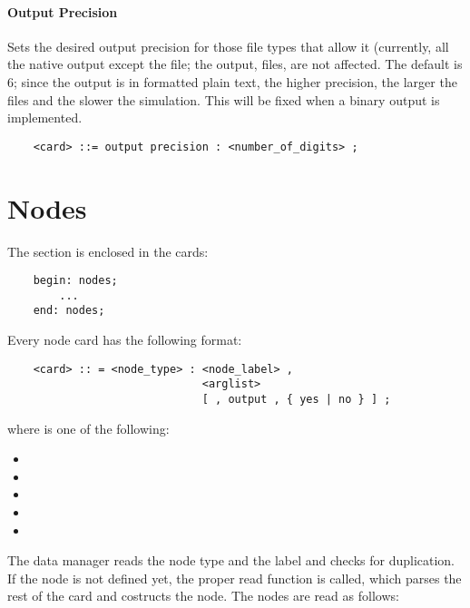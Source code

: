\subsubsection{Output Precision}
Sets the desired output precision for those file types that allow it
(currently, all the native output except the  file; the
 output,  files, are not affected.
The default is 6; since the output is in formatted plain text, the higher
precision, the larger the files and the slower the simulation.
This will be fixed when a binary output is implemented.
\begin{verbatim}
    <card> ::= output precision : <number_of_digits> ;
\end{verbatim}





\chapter{Nodes}
The  section is enclosed in the cards:
\begin{verbatim}
    begin: nodes;
        ...
    end: nodes;
\end{verbatim}
Every node card has the following format:
\begin{verbatim}
    <card> :: = <node_type> : <node_label> ,
                              <arglist>
                              [ , output , { yes | no } ] ;
\end{verbatim}
where  is one of the following:
\begin{itemize}
    \item {}
    \item {}
    \item {}
    \item {}
    \item {}
\end{itemize}
The data manager reads the node type and the label and checks for
duplication. If the node is not defined yet, the proper read function is
called, which parses the rest of the card and costructs the node.
The nodes are read as follows:




